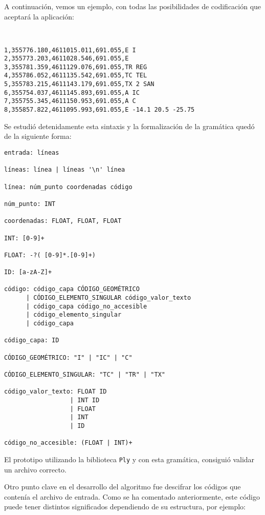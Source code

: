 A continuación, vemos un ejemplo, con todas las posibilidades de codificación que aceptará la aplicación: 
\begin{verbatim}


1,355776.180,4611015.011,691.055,E I
2,355773.203,4611028.546,691.055,E
3,355781.359,4611129.076,691.055,TR REG
4,355786.052,4611135.542,691.055,TC TEL
5,355783.215,4611143.179,691.055,TX 2 SAN
6,355754.037,4611145.893,691.055,A IC
7,355755.345,4611150.953,691.055,A C
8,355857.822,4611095.993,691.055,E -14.1 20.5 -25.75
\end{verbatim}



Se estudió detenidamente esta sintaxis y la formalización de la gramática quedó de la siguiente forma:

\begin{verbatim}
entrada: líneas

líneas: línea | líneas '\n' línea

línea: núm_punto coordenadas código

núm_punto: INT

coordenadas: FLOAT, FLOAT, FLOAT

INT: [0-9]+

FLOAT: -?( [0-9]*.[0-9]+)

ID: [a-zA-Z]+

código: código_capa CÓDIGO_GEOMÉTRICO
      | CÓDIGO_ELEMENTO_SINGULAR código_valor_texto
      | código_capa código_no_accesible
      | código_elemento_singular
      | código_capa      
      
código_capa: ID

CÓDIGO_GEOMÉTRICO: "I" | "IC" | "C"

CÓDIGO_ELEMENTO_SINGULAR: "TC" | "TR" | "TX"

código_valor_texto: FLOAT ID
                  | INT ID
                  | FLOAT
                  | INT
                  | ID       
                                 
código_no_accesible: (FLOAT | INT)+
\end{verbatim}

El prototipo utilizando la biblioteca \texttt{Ply} y con esta gramática,  consiguió validar un archivo correcto.

Otro punto clave en el desarrollo del algoritmo fue descifrar los códigos que contenía el archivo de entrada. Como se ha comentado anteriormente, este código puede tener distintos significados dependiendo de su estructura, por ejemplo:

